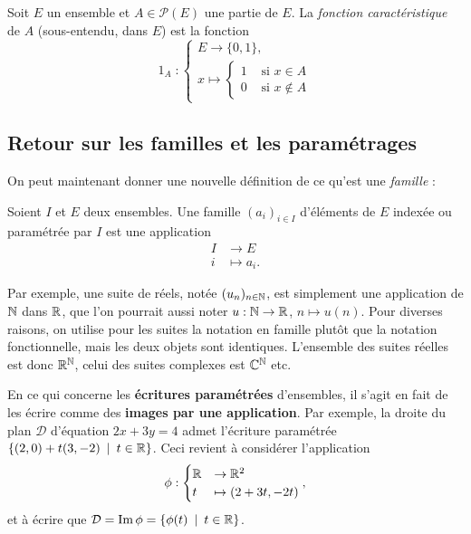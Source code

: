 \begin{definition}
Soit $E$ un ensemble et $A\in \mathcal P(E)$ une partie de $E$. La \emph{fonction caractéristique} de $A$ (sous-entendu, dans $E$) est la fonction 
\[
\operatorname{1}_A :\begin{cases}E \to \{0,1\},\\ x\mapsto \begin{cases}1&\text{ si } x\in A\\0&\text{ si } x\not\in A\end{cases}\end{cases}
\]
\end{definition}




\subsection{Retour sur les familles et les paramétrages}
\label{subsec-retour-parametrage-familles}

On peut maintenant donner une nouvelle définition de ce qu'est une \emph{famille} :

\begin{definition}
Soient $I$ et $E$ deux ensembles. Une famille $(a_i)_{i\in I}$ d'éléments de $E$ indexée ou paramétrée par $I$ est une application
\begin{align*}
I&\to E\\ i&\mapsto a_i.
\end{align*}
\end{definition}

Par exemple, une suite de réels, notée $(u_n)_{n\in \mathbb{N}}$, est  simplement une application de $\mathbb{N}$ dans $\mathbb{R}$, que l'on pourrait aussi noter  $u : \mathbb{N}\to \mathbb{R}$, $n\mapsto u(n)$. Pour diverses raisons, on utilise pour les suites la notation en famille plutôt que la notation fonctionnelle, mais les deux objets sont identiques. L'ensemble des suites réelles est donc $\mathbb{R}^{\mathbb{N}}$, celui des suites complexes est $\mathbb{C}^{\mathbb{N}}$ etc.

En ce qui concerne les \textbf{écritures paramétrées} d'ensembles, il s'agit en fait de les écrire comme des \textbf{images par une application}. Par exemple, la droite du plan $\mathcal D$ d'équation $2x+3y=4$ admet l'écriture paramétrée $\{(2,0)+t(3,-2)\:\mid\: t\in \R\}$. Ceci revient à considérer l'application
\[ \phi:\begin{cases} \mathbb{R} &\to \mathbb{R}^2\\ t &\mapsto (2+3t,-2t)\end{cases}
,\]
et à écrire que $\mathcal D = \Im \phi  = \{\phi(t)\:\mid\: t\in \R\}$.

